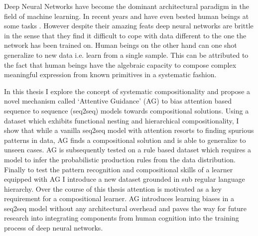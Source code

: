 	Deep Neural Networks have become the dominant architectural paradigm in the field of machine learning. In recent years and have even bested human beings at some tasks \citep{Silver2016}. However despite their amazing feats deep neural networks are brittle in the sense that they find it difficult to cope with data different to the one the network has been trained on. Human beings on the other hand can one shot generalize to new data i.e. learn from a single sample. This can be attributed to the fact that human beings have the algebraic capacity \citep{marcus2003algebraic} to compose complex meaningful expression from known primitives in a systematic fashion.
	
	In this thesis I explore the concept of systematic compositionality and propose a novel mechanism called \lq Attentive Guidance\rq{} (AG) to bias attention based sequence to sequence (seq2seq) models towards compositional solutions. Using a dataset which exhibits functional nesting and hierarchical compositionality, I show that while a vanilla seq2seq model with attention resorts to finding spurious patterns in data, AG finds a compositional solution and is able to generalize to unseen cases. AG is subsequently tested on a rule based dataset which requires a model to infer the probabilistic production rules from the data distribution. Finally to test the pattern recognition and compositional skills of a learner equipped with AG I introduce a new dataset grounded in sub regular language hierarchy. Over the course of this thesis attention is motivated as a key requirement for a compositional learner. AG introduces learning biases in a seq2seq model without any architectural overhead and paves the way for future research into integrating components from human cognition into the training process of deep neural networks.


